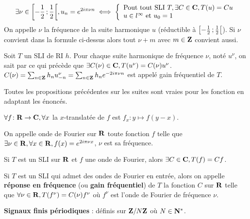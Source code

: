 \begin{pop}
	$$\exists \nu \in \mathopen{}\mathclose{\left[-\frac{1}{2}\mathclose{}\mathpunct{};\frac{1}{2}\right[}, u_n = e^{2i\pi \nu n} \iff
	\left\{\begin{array}{l}
		\text{Pout tout SLI } T, \exists C \in \mathbf{C}, T(u) = Cu \\
		u \in l^\infty \text{ et } u_0 = 1
	\end{array}\right.$$
	On appelle $\nu$ la fréquence de la suite harmonique $u$ (réductible à $\mathopen{}\mathclose{\left[-\frac{1}{2}\mathclose{}\mathpunct{};\frac{1}{2}\right[}$).
	Si $\nu$ convient dans la formule ci-dessus alors tout $\nu + m$ avec $m \in \mathbf{Z}$ convient aussi.
\end{pop}

\begin{pop}
	Soit $T$ un SLI de RI $h$.
	Pour chaque suite harmonique de fréquence $\nu$, noté $u^\nu$, on sait par ce qui précède que $\exists C(\nu) \in \mathbf{C}, T(u^\nu) = C(\nu)u^\nu$.
	$C(\nu) = \sum_{n \in \mathbf{Z}} h_n u^\nu_{-n} = \sum_{n \in \mathbf{Z}} h_n e^{-2i\pi \nu n}$ est appelé gain fréquentiel de $T$.
\end{pop}

Toutes les propositions précédentes sur les suites sont vraies pour les fonction en adaptant les énoncés.

\begin{defn}
	$\forall f \colon \mathbf{R} \to \mathbf{C}, \forall x$ la $x$-translatée de $f$ est $f_x \colon y \mapsto f(y - x)$.
\end{defn}

\begin{defn}
	On appelle onde de Fourier sur $\mathbf{R}$ toute fonction $f$ telle que $\exists \nu \in \mathbf{R}, \forall x \in \mathbf{R}, f(x) = e^{2i\pi \nu x}$, $\nu$ est sa fréquence.
\end{defn}

\begin{pop}
	Si $T$ est un SLI sur $\mathbf{R}$ et $f$ une onde de Fourier, alors $\exists C \in \mathbf{C}, T(f) = Cf$.
\end{pop}

	\begin{defn}
	Si $T$ est un SLI qui admet des ondes de Fourier en entrée, alors on appelle \textbf{réponse en fréquence} (ou \textbf{gain fréquentiel}) de $T$ la fonction $C$ sur $\mathbf{R}$ telle que $\forall \nu \in \mathbf{R}, T(f^\nu) = C(\nu) f^\nu$ où $f^\nu$ est l'onde de Fourier de fréquence $\nu$.
\end{defn}

\begin{defn}
	\textbf{Signaux finis périodiques} : définis sur $\mathbf{Z} / N\mathbf{Z}$ où $N \in \mathbf{N}^*$.
\end{defn}

